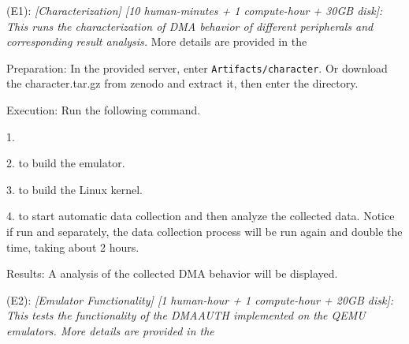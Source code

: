\begin{compactdesc}

    \item[(E1):] \textit{[Characterization] [10 human-minutes + 1 compute-hour + 30GB disk]:
    This runs the characterization of DMA behavior of different peripherals and corresponding result analysis.} More details are provided in the 

    \begin{asparadesc}

        \vspace{6pt}
        \item[Preparation:] In the provided server, enter \texttt{Artifacts/character}. Or download the character.tar.gz from zenodo and extract it, then enter the  directory.
        \vspace{6pt}

        \item[Execution:] Run the following command.

        1. 

        2.  to build the emulator.

        3.  to build the Linux kernel.

        4.  to start automatic data collection and then analyze the collected data. Notice if run  and  separately, the data collection process will be run again and double the time, taking about 2 hours.
        \vspace{6pt}

        \item[Results:] A analysis of the collected DMA behavior will be displayed.
    \end{asparadesc}

    \vspace{8pt}

    \item[(E2):] \textit{[Emulator Functionality] [1 human-hour + 1 compute-hour + 20GB disk]: This tests the functionality of the DMAAUTH implemented on the QEMU emulators. More details are provided in the} 
    \begin{asparadesc}


\end{asparadesc}
\end{compactdesc}
